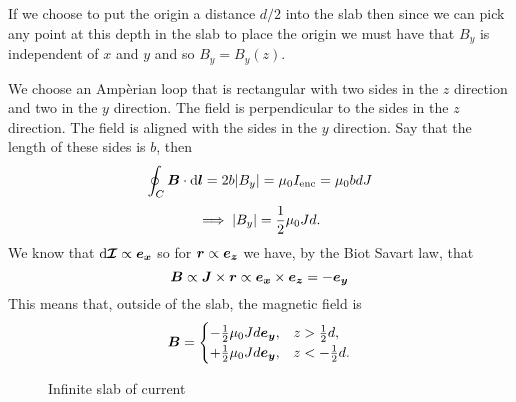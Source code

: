     If we choose to put the origin a distance \(d/2\) into the slab then since we can pick any point at this depth in the slab to place the origin we must have that \(B_y\) is independent of \(x\) and \(y\) and so \(B_y = B_y(z)\).
    
    We choose an Amp\`erian loop that is rectangular with two sides in the \(z\) direction and two in the \(y\) direction.
    The field is perpendicular to the sides in the \(z\) direction.
    The field is aligned with the sides in the \(y\) direction.
    Say that the length of these sides is \(b\), then
    \[\oint_C \bm{B}\cdot\dd{\bm{l}} = 2b\abs{B_y} = \mu_0I_{\mathrm{enc}} = \mu_0 bdJ\]
    \[\implies \abs{B_y} = \frac{1}{2}\mu_0 Jd.\]
    We know that \(\dd{\bm{\mathcal{I}}}\propto\bm{e_{x}}\) so for \(\bm{r}\propto\bm{e_{z}}\) we have, by the Biot Savart law, that
    \[\bm{B} \propto \bm{J}\times\bm{r} \propto \bm{e_{x}}\times\bm{e_{z}} = -\bm{e_{y}}\]
    This means that, outside of the slab, the magnetic field is
    \[
        \bm{B} =
        \begin{cases}
            -\frac{1}{2}\mu_0 Jd\bm{e_{y}}, & z > \frac{1}{2}d,\\
            +\frac{1}{2}\mu_0 Jd\bm{e_{y}}, & z < -\frac{1}{2}d.
        \end{cases}
    \]
    \begin{figure}[ht]
        \centering
        \caption{Infinite slab of current}
    \end{figure}

